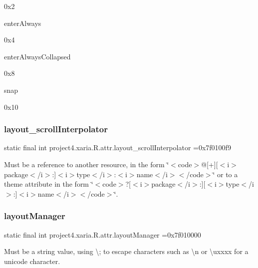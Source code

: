 0x2

{\ttfamily enter\+Always}

0x4

{\ttfamily enter\+Always\+Collapsed}

0x8

{\ttfamily snap}

0x10\mbox{\label{classproject4_1_1xaria_1_1R_1_1attr_a93e084a800c058b77038bd341b19a69e}} 
\subsubsection{\texorpdfstring{layout\+\_\+scroll\+Interpolator}{layout\_scrollInterpolator}}
{\footnotesize\ttfamily static final int project4.\+xaria.\+R.\+attr.\+layout\+\_\+scroll\+Interpolator =0x7f0100f9\hspace{0.3cm}{\ttfamily [static]}}

Must be a reference to another resource, in the form \char`\"{}$<$code$>$@\mbox{[}+\mbox{]}\mbox{[}$<$i$>$package$<$/i$>$\+:\mbox{]}$<$i$>$type$<$/i$>$\+:$<$i$>$name$<$/i$>$$<$/code$>$\char`\"{} or to a theme attribute in the form \char`\"{}$<$code$>$?\mbox{[}$<$i$>$package$<$/i$>$\+:\mbox{]}\mbox{[}$<$i$>$type$<$/i$>$\+:\mbox{]}$<$i$>$name$<$/i$>$$<$/code$>$\char`\"{}. \mbox{\label{classproject4_1_1xaria_1_1R_1_1attr_ab2e15ebfa2ea2b892083b15b09eb6020}} 
\subsubsection{\texorpdfstring{layout\+Manager}{layoutManager}}
{\footnotesize\ttfamily static final int project4.\+xaria.\+R.\+attr.\+layout\+Manager =0x7f010000\hspace{0.3cm}{\ttfamily [static]}}

Must be a string value, using \textquotesingle{}\textbackslash{};\textquotesingle{} to escape characters such as \textquotesingle{}\textbackslash{}n\textquotesingle{} or \textquotesingle{}\textbackslash{}uxxxx\textquotesingle{} for a unicode character. 

